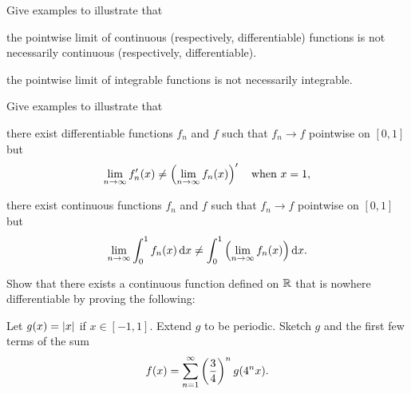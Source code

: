 \documentclass{../homework}
\begin{document}
\begin{problems}
\item Give examples to illustrate that
  \begin{problems}
  \item the pointwise limit of continuous (respectively,
    differentiable) functions is not necessarily continuous
    (respectively, differentiable).

    \begin{solution}
    \end{solution}

  \item the pointwise limit of integrable functions is not necessarily
    integrable.

    \begin{solution}
    \end{solution}
  \end{problems}

\item Give examples to illustrate that
  \begin{problems}
  \item there exist differentiable functions \(f_n\) and \(f\) such
    that \(f_n \to f\) pointwise on \([0, 1]\) but
    \[
      \lim_{n\to\infty} f_n'(x) \ne \left(\lim_{n\to\infty} f_n(x)\right)'
      \quad \text{when \(x=1\)},
    \]

    \begin{solution}
    \end{solution}

  \item there exist continuous functions \(f_n\) and \(f\) such that
    \(f_n \to f\) pointwise on \([0, 1]\) but
    \[
      \lim_{n\to\infty} \int_0^1 f_n(x) \mathop{}\!\mathrm d x
      \ne \int_0^1 \left(\lim_{n\to\infty} f_n(x)\right) \mathop{}\!\mathrm d x.
    \]

    \begin{solution}
    \end{solution}
  \end{problems}

\item Show that there exists a continuous function defined on \(\mathbb R\)
  that is nowhere differentiable by proving the following:
  \begin{problems}
  \item Let \(g(x) = \lvert x\rvert\) if \(x \in [-1, 1]\).  Extend \(g\) to
    be periodic.  Sketch \(g\) and the first few terms of the sum
    \[
      f(x) = \sum_{n=1}^\infty \left(\frac 3 4\right)^n g(4^n x).
    \]

    \begin{solution}
    \end{solution}


\end{problems}
\end{problems}
\end{document}
